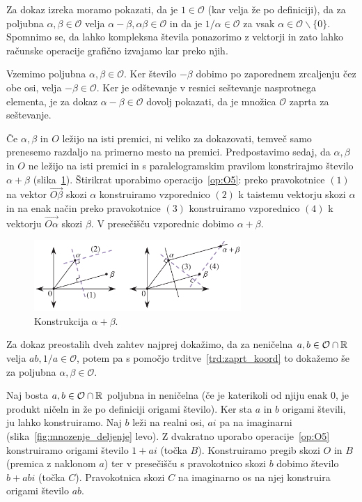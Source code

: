 \begin{dokaz}
    Za dokaz izreka moramo pokazati, da je $1 \in \mathcal{O}$ (kar velja že po definiciji), da za poljubna $\alpha, \beta \in \mathcal{O}$ velja $\alpha - \beta, \alpha\beta \in \mathcal{O}$ in da je $1/\alpha \in \mathcal{O}$ za vsak $\alpha \in \mathcal{O} \backslash \{0\}$. Spomnimo se, da lahko kompleksna števila ponazorimo z vektorji in zato lahko računske operacije grafično izvajamo kar preko njih.

    Vzemimo poljubna $\alpha, \beta \in \mathcal{O}$. Ker število $-\beta$ dobimo po zaporednem zrcaljenju čez obe osi, velja $-\beta \in \mathcal{O}$. Ker je odštevanje v resnici seštevanje nasprotnega elementa, je za dokaz $\alpha - \beta \in \mathcal{O}$ dovolj pokazati, da je množica $\mathcal{O}$ zaprta za seštevanje.

    Če $\alpha, \beta$ in $O$ ležijo na isti premici, ni veliko za dokazovati, temveč samo prenesemo razdaljo na primerno mesto na premici. Predpostavimo sedaj, da $\alpha, \beta$ in $O$ ne ležijo na isti premici in s paralelogramskim pravilom konstrirajmo število $\alpha + \beta$ (slika~\ref{fig:sestevanje}). Štirikrat uporabimo operacijo~\ref{op:O5}: preko pravokotnice $(1)$ na vektor $\overrightarrow{O\beta}$ skozi $\alpha$ konstruiramo vzporednico $(2)$ k taistemu vektorju skozi $\alpha$ in na enak način preko pravokotnice $(3)$ konstruiramo vzporednico $(4)$ k vektorju $\overrightarrow{O\alpha}$ skozi $\beta$. V presečišču vzporednic dobimo $\alpha + \beta$.

    \begin{figure}[h]
        \centering
        \includegraphics[width=0.7\textwidth]{images/algebra/sestevanje.png}
        \caption[Seštevanje origami števil]{Konstrukcija $\alpha + \beta$.}
        \label{fig:sestevanje}
    \end{figure}

    Za dokaz preostalih dveh zahtev najprej dokažimo, da za neničelna $a, b \in \mathcal{O} \cap \mathbb R$ velja $ab, 1/a \in \mathcal{O}$, potem pa s pomočjo trditve~\ref{trd:zaprt_koord} to dokažemo še za poljubna $\alpha, \beta \in \mathcal{O}$.

    Naj bosta $a, b \in \mathcal{O} \cap \mathbb R$ poljubna in neničelna (če je katerikoli od njiju enak $0$, je produkt ničeln in že po definiciji origami število). Ker sta $a$ in $b$ origami števili, ju lahko konstruiramo. Naj $b$ leži na realni osi, $ai$ pa na imaginarni (slika~\ref{fig:mnozenje_deljenje} levo). Z dvakratno uporabo operacije~\ref{op:O5} konstruiramo origami število $1 + ai$ (točka $B$). Konstruiramo pregib skozi $O$ in $B$ (premica z naklonom $a$) ter v presečišču s pravokotnico skozi $b$ dobimo število $b + abi$ (točka $C$). Pravokotnica skozi $C$ na imaginarno os na njej konstruira origami število $ab$.


\end{dokaz}

